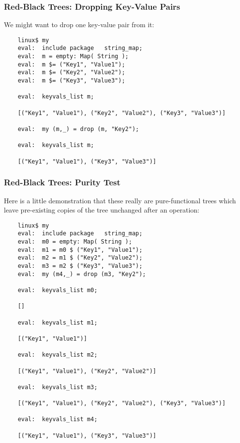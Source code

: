 \cutend*

\subsubsection{Red-Black Trees:  Dropping Key-Value Pairs}

We might want to drop one key-value pair from it:

\begin{verbatim}
    linux$ my
    eval:  include package   string_map;
    eval:  m = empty: Map( String );
    eval:  m $= ("Key1", "Value1");
    eval:  m $= ("Key2", "Value2");
    eval:  m $= ("Key3", "Value3");

    eval:  keyvals_list m;

    [("Key1", "Value1"), ("Key2", "Value2"), ("Key3", "Value3")]

    eval:  my (m,_) = drop (m, "Key2");

    eval:  keyvals_list m;

    [("Key1", "Value1"), ("Key3", "Value3")]
\end{verbatim}

\cutend*

\subsubsection{Red-Black Trees:  Purity Test}

Here is a little demonstration that these really are pure-functional 
trees which leave pre-existing copies of the tree unchanged after 
an operation:

\begin{verbatim}
    linux$ my
    eval:  include package   string_map;
    eval:  m0 = empty: Map( String );
    eval:  m1 = m0 $ ("Key1", "Value1");
    eval:  m2 = m1 $ ("Key2", "Value2");
    eval:  m3 = m2 $ ("Key3", "Value3");
    eval:  my (m4,_) = drop (m3, "Key2");

    eval:  keyvals_list m0;

    []

    eval:  keyvals_list m1;

    [("Key1", "Value1")]

    eval:  keyvals_list m2;

    [("Key1", "Value1"), ("Key2", "Value2")]

    eval:  keyvals_list m3;

    [("Key1", "Value1"), ("Key2", "Value2"), ("Key3", "Value3")]

    eval:  keyvals_list m4;

    [("Key1", "Value1"), ("Key3", "Value3")]
\end{verbatim}

